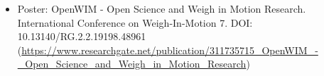 \documentclass[10pt,a4paper,sans]{moderncv}        %
\begin{document}


\nocite{*}


\begin{itemize}
\item  Poster: OpenWIM - Open Science and Weigh in Motion Research. International Conference on Weigh-In-Motion 7. DOI: 10.13140/RG.2.2.19198.48961 (\url{https://www.researchgate.net/publication/311735715_OpenWIM_-_Open_Science_and_Weigh_in_Motion_Research})
\end{itemize}


\end{document}
